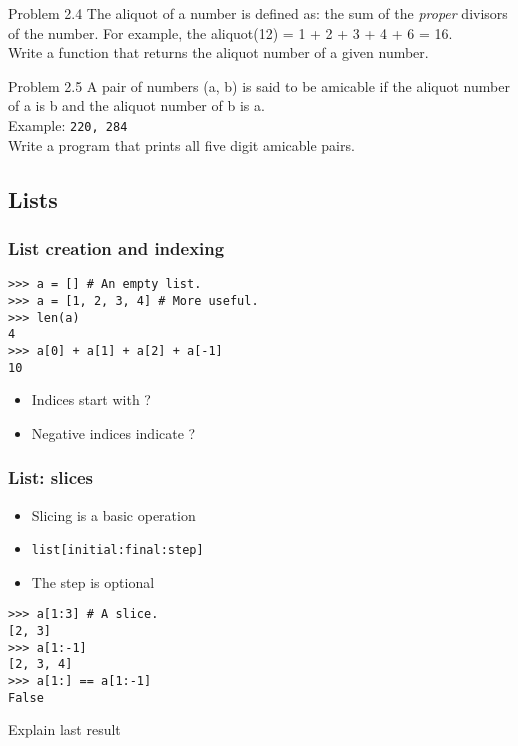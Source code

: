 \documentclass[14pt,compress]{beamer}
\newcounter{time}
\newcommand{\inctime}[1]{\addtocounter{time}{#1}{\tiny \thetime\ m}}
\newcommand{\typ}[1]{\texttt{#1}}
\begin{document}
\begin{frame}{Problem 2.4}
  The aliquot of a number is defined as: the sum of the \emph{proper} divisors of the number. For example, the aliquot(12) = 1 + 2 + 3 + 4 + 6 = 16.\\
  Write a function that returns the aliquot number of a given number. 
\end{frame}

\begin{frame}{Problem 2.5}
  A pair of numbers (a, b) is said to be \alert{amicable} if the aliquot number of a is b and the aliquot number of b is a.\\
  Example: \texttt{220, 284}\\
  Write a program that prints all five digit amicable pairs.
  \inctime{30}
\end{frame}


\subsection{Lists}

\begin{frame}[fragile]
  \frametitle{List creation and indexing}
\begin{lstlisting}
>>> a = [] # An empty list.
>>> a = [1, 2, 3, 4] # More useful.
>>> len(a) 
4
>>> a[0] + a[1] + a[2] + a[-1]
10
\end{lstlisting}
  \begin{itemize}
  \item Indices start with ?
  \item Negative indices indicate ?
  \end{itemize}
\end{frame}

\begin{frame}[fragile]
  \frametitle{List: slices}
  \begin{itemize}
  \item Slicing is a basic operation
  \item \typ{list[initial:final:step]}
  \item  The step is optional
  \end{itemize}
\begin{lstlisting}
>>> a[1:3] # A slice.
[2, 3]
>>> a[1:-1]
[2, 3, 4]
>>> a[1:] == a[1:-1]
False  
\end{lstlisting}
Explain last result
\end{frame}
\end{document}
